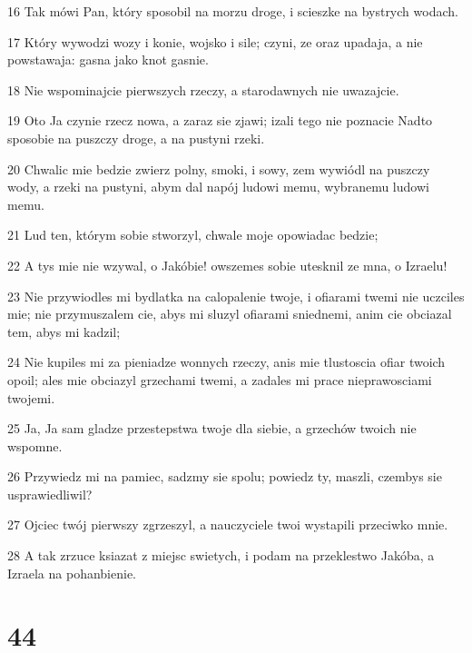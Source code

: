 \par 16 Tak mówi Pan, który sposobil na morzu droge, i scieszke na bystrych wodach.
\par 17 Który wywodzi wozy i konie, wojsko i sile; czyni, ze oraz upadaja, a nie powstawaja: gasna jako knot gasnie.
\par 18 Nie wspominajcie pierwszych rzeczy, a starodawnych nie uwazajcie.
\par 19 Oto Ja czynie rzecz nowa, a zaraz sie zjawi; izali tego nie poznacie Nadto sposobie na puszczy droge, a na pustyni rzeki.
\par 20 Chwalic mie bedzie zwierz polny, smoki, i sowy, zem wywiódl na puszczy wody, a rzeki na pustyni, abym dal napój ludowi memu, wybranemu ludowi memu.
\par 21 Lud ten, którym sobie stworzyl, chwale moje opowiadac bedzie;
\par 22 A tys mie nie wzywal, o Jakóbie! owszemes sobie utesknil ze mna, o Izraelu!
\par 23 Nie przywiodles mi bydlatka na calopalenie twoje, i ofiarami twemi nie uczciles mie; nie przymuszalem cie, abys mi sluzyl ofiarami sniednemi, anim cie obciazal tem, abys mi kadzil;
\par 24 Nie kupiles mi za pieniadze wonnych rzeczy, anis mie tlustoscia ofiar twoich opoil; ales mie obciazyl grzechami twemi, a zadales mi prace nieprawosciami twojemi.
\par 25 Ja, Ja sam gladze przestepstwa twoje dla siebie, a grzechów twoich nie wspomne.
\par 26 Przywiedz mi na pamiec, sadzmy sie spolu; powiedz ty, maszli, czembys sie usprawiedliwil?
\par 27 Ojciec twój pierwszy zgrzeszyl, a nauczyciele twoi wystapili przeciwko mnie.
\par 28 A tak zrzuce ksiazat z miejsc swietych, i podam na przeklestwo Jakóba, a Izraela na pohanbienie.

\chapter{44}

